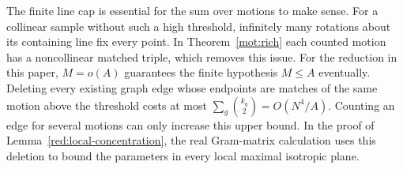 \begin{remark}
\label{mot:scope}
The finite line cap is essential for the sum over motions to make
sense.  For a collinear sample without such a high threshold,
infinitely many rotations about its containing line fix every
point.  In Theorem~\ref{mot:rich} each counted motion has a
noncollinear matched triple, which removes this issue.
For the reduction in this paper, \(M=o(A)\) guarantees the finite
hypothesis \(M\le A\) eventually.  Deleting every existing graph
edge whose endpoints are matches of the same motion above the threshold
costs at most \(\sum_g\binom{k_g}{2}=O(N^4/A)\).  Counting an edge for
several motions can only increase this upper bound.  In the proof of
Lemma~\ref{red:local-concentration}, the real Gram-matrix calculation
uses this deletion to bound the parameters in every local maximal
isotropic plane.
\end{remark}
